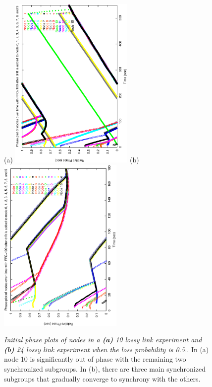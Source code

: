 \begin{figure}
\centerline{%
(a)
\includegraphics[width=6cm,angle=270]{figures/10-links-loss-0.5-run-6-begin-phase.ps}
(b)
\includegraphics[width=6cm,angle=270]{figures/24-links-loss-0.5-run-6-begin-phase.ps}
}
\caption{ {\it Initial phase plots of nodes in a {\bf(a)} 10 lossy link experiment and {\bf(b)} 24 lossy link experiment when the loss probability is 0.5.}. In (a) node 10 is significantly out of phase with the remaining two synchronized subgroups. In (b), there are three main synchronized subgroups that gradually converge to synchrony with the others.}
\label{fig:begin-phase10-24}
\end{figure}

